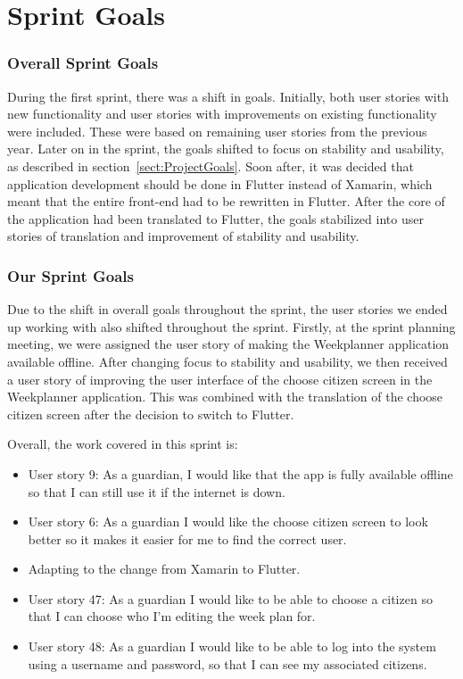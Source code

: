 \section{Sprint Goals}
\subsubsection{Overall Sprint Goals} \label{sect:1SprintGoals}
During the first sprint, there was a shift in goals. Initially, both user stories with new functionality and user stories with improvements on existing functionality were included. These were based on remaining user stories from the previous year. Later on in the sprint, the goals shifted to focus on stability and usability, as described in section~\ref{sect:ProjectGoals}.
Soon after, it was decided that application development should be done in Flutter instead of Xamarin, which meant that the entire front-end had to be rewritten in Flutter.
After the core of the application had been translated to Flutter, the goals stabilized into user stories of translation and improvement of stability and usability.


\subsubsection{Our Sprint Goals}
Due to the shift in overall goals throughout the sprint, the user stories we ended up working with also shifted throughout the sprint. Firstly, at the sprint planning meeting, we were assigned the user story of making the Weekplanner application available offline.
After changing focus to stability and usability, we then received a user story of improving the user interface of the choose citizen screen in the Weekplanner application. This was combined with the translation of the choose citizen screen after the decision to switch to Flutter.

Overall, the work covered in this sprint is:

\begin{itemize}
    \item User story 9: As a guardian, I would like that the app is fully available offline so that I can still use it if the internet is down.
    \item User story 6: As a guardian I would like the choose citizen screen to look better so it makes it easier for me to find the correct user.
    \item Adapting to the change from Xamarin to Flutter.
    \item User story 47: As a guardian I would like to be able to choose a citizen so that I can choose who I’m editing the week plan for.
    \item User story 48: As a guardian I would like to be able to log into the system using a username and password, so that I can see my associated citizens.
\end{itemize}

